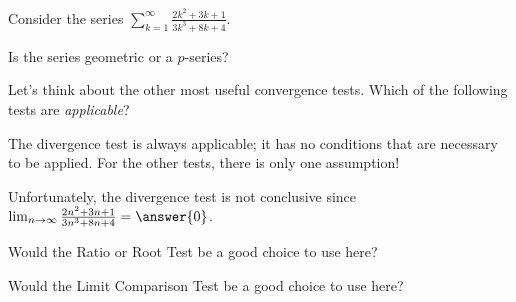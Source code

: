 \documentclass{ximera}
\author{Jim Talamo}
\begin{document}
\begin{exercise}

Consider the series $\sum_{k=1}^{\infty} \frac{2k^2+3k+1}{3k^3+8k+4}$.  

Is the series geometric or a $p$-series?

\begin{multipleChoice}
\end{multipleChoice}

Let's think about the other most useful convergence tests.  Which of the following tests are \emph{applicable}?

\begin{selectAll}
\end{selectAll}

\begin{hint}
The divergence test is always applicable; it has no conditions that are necessary to be applied. For the other tests, there is only one assumption!
\end{hint}

\begin{exercise}
Unfortunately, the divergence test is not conclusive since $\lim_{n \to \infty}  \frac{2n^2+3n+1}{3n^3+8n+4} = \answer{0}$.  
\end{exercise}

\begin{exercise}
Would the Ratio or Root Test be a good choice to use here?

\begin{multipleChoice}
\end{multipleChoice}
\end{exercise}

\begin{exercise}
Would the Limit Comparison Test be a good choice to use here?  
\begin{multipleChoice}
\end{multipleChoice}


\end{exercise}
\end{exercise}
\end{document}
